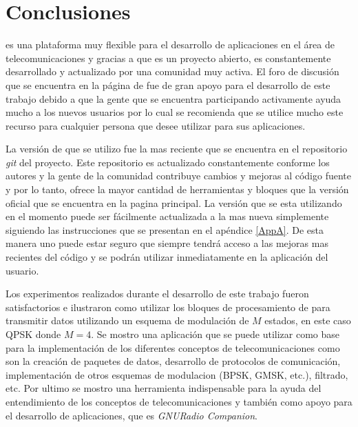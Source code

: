 \chapter{Conclusiones}
\gnuradio es una plataforma muy flexible para el desarrollo de aplicaciones en el \'area de telecomunicaciones y gracias a que es
un proyecto abierto, es constantemente desarrollado y actualizado por una comunidad muy activa. El foro de discusi\'on que se
encuentra en la p\'agina de \gnuradio \cite{radio} fue de gran apoyo para el desarrollo de este trabajo debido a que la gente que
se encuentra participando activamente ayuda mucho a los nuevos usuarios por lo cual se recomienda que se utilice mucho este recurso para
cualquier persona que desee utilizar \gnuradio para sus aplicaciones.

La versi\'on de \gnuradio que se utilizo fue la mas reciente que se encuentra en el repositorio \emph{git} del proyecto. Este
repositorio es actualizado constantemente conforme los autores y la gente de la comunidad contribuye cambios y mejoras al c\'odigo
fuente y por lo tanto, ofrece la mayor cantidad de herramientas y bloques que la versi\'on oficial que se encuentra en la pagina
principal. La versi\'on que se esta utilizando en el momento puede ser f\'acilmente actualizada a la mas nueva simplemente
siguiendo las instrucciones que se presentan en el ap\'endice \ref{AppA}. De esta manera uno puede estar seguro que siempre
tendr\'a acceso a las mejoras mas recientes del c\'odigo y se podr\'an utilizar inmediatamente en la aplicaci\'on del usuario.

Los experimentos realizados durante el desarrollo de este trabajo fueron satisfactorios e ilustraron como utilizar los bloques de
procesamiento de \gnuradio para transmitir datos utilizando un esquema de modulaci\'on de $M$ estados, en este caso QPSK donde
$M=4$. Se mostro una aplicaci\'on que se puede utilizar como base para la implementaci\'on de los diferentes conceptos de
telecomunicaciones como son la creaci\'on de paquetes de datos, desarrollo de protocolos de comunicaci\'on, implementaci\'on de
otros esquemas de modulacion (BPSK, GMSK, etc.), filtrado, etc. Por ultimo se mostro una herramienta indispensable para la ayuda del
entendimiento de los conceptos de telecomunicaciones y tambi\'en como apoyo para el desarrollo de aplicaciones, que es
\emph{GNURadio Companion}.

